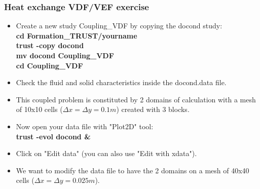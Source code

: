 \documentclass[10pt, hyperref={unicode=true,pdfusetitle, bookmarks=true,bookmarksnumbered=false,bookmarksopen=false, breaklinks=false,pdfborder={0 0 1},backref=true,colorlinks=true,linkcolor=darkblue,pageanchor}]{beamer}
\begin{document}
\begin{frame}
\frametitle{Heat exchange VDF/VEF exercise}
\begin{block}{}

\begin{itemize}
\item Create a new study Coupling\_VDF by copying the docond study:\\
\textbf{cd Formation\_TRUST/yourname} \\
\textbf{trust -copy docond} \\
\textbf{mv docond Coupling\_VDF} \\
\textbf{cd Coupling\_VDF} \\

\item Check the fluid and solid characteristics inside the docond.data file.

\item This coupled problem is constituted by 2 domains of calculation with a mesh of 10x10 cells ($\Delta x = \Delta y = 0.1m$) created with 3 blocks. 

\item Now open your data file with "Plot2D" tool:\\
\textbf{trust -evol docond  \&} \\

\item Click on "Edit data" (you can also use "Edit with xdata").

\item We want to modify the data file to have the 2 domains on a mesh of 40x40 cells ($\Delta x= \Delta y=0.025m$). 
\end{itemize}

\end{block}
\end{frame}
\end{document}
